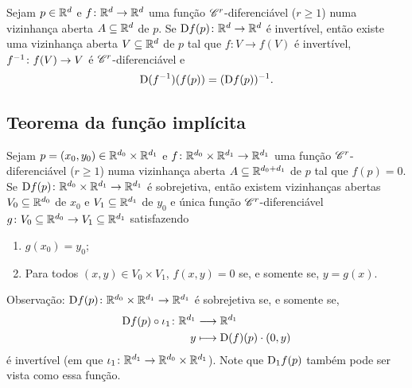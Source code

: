 \begin{proposition}

Sejam $p \in \mathbb{R}^d$ e $f\colon \mathbb{R}^d \to \mathbb{R}^d$ uma função $\mathscr{C}^r$-diferenciável ($r \geq 1$) numa vizinhança aberta $A \subseteq \mathbb{R}^d$ de $p$. Se $\mathrm{D} f(p)\colon \mathbb{R}^d \to \mathbb{R}^d$ é invertível, então existe uma vizinhança aberta $V \subseteq \mathbb{R}^d$ de $p$ tal que $f\colon V \to f(V)$ é invertível, $f^{-1}\colon f(V) \to V$ é $\mathscr{C}^r$-diferenciável e
	\begin{equation*}
	\mathrm{D}(f^{-1})(f(p)) = (\mathrm{D} f(p))^{-1}.
	\end{equation*}
\end{proposition}

\subsection{Teorema da função implícita}

\begin{proposition}

Sejam $p=(x_0,y_0) \in \mathbb{R}^{d_0} \times \mathbb{R}^{d_1}$ e $f\colon \mathbb{R}^{d_0} \times \mathbb{R}^{d_1} \to \mathbb{R}^{d_1}$ uma função $\mathscr{C}^r$-diferenciável ($r \geq 1$) numa vizinhança aberta $A \subseteq \mathbb{R}^{d_0+d_1}$ de $p$ tal que $f(p)=0$.
Se $\mathrm{D} f(p)\colon \mathbb{R}^{d_0} \times \mathbb{R}^{d_1} \to \mathbb{R}^{d_1}$ é sobrejetiva, então existem vizinhanças abertas $V_0 \subseteq \mathbb{R}^{d_0}$ de $x_0$ e $V_1 \subseteq \mathbb{R}^{d_1}$ de $y_0$ e única função $\mathscr{C}^r$-diferenciável $g\colon V_0 \subseteq \mathbb{R}^{d_0} \to V_1 \subseteq \mathbb{R}^{d_1}$ satisfazendo
	\begin{enumerate}
	\item $g(x_0)=y_0$;
	\item Para todos $(x,y) \in V_0 \times V_1$, $f(x,y)=0$ se, e somente se, $y=g(x)$.
	\end{enumerate}
\end{proposition}

Observação: $\mathrm{D} f(p)\colon \mathbb{R}^{d_0} \times \mathbb{R}^{d_1} \to \mathbb{R}^{d_1}$ é sobrejetiva se, e somente se,
	\begin{align*}
	{\mathrm{D}f(p) \circ \iota_1}\colon {\mathbb{R}^{d_1}} &\longrightarrow {\mathbb{R}^{d_1}} \\{y} &\longmapsto \mathrm{D}(f)(p) \cdot (0,y)
	\end{align*}
é invertível (em que $\iota_1\colon \mathbb{R}^{d_1} \to \mathbb{R}^{d_0} \times \mathbb{R}^{d_1}$).  Note que $\mathrm{D}_1 f(p)$ também pode ser vista como essa função.

